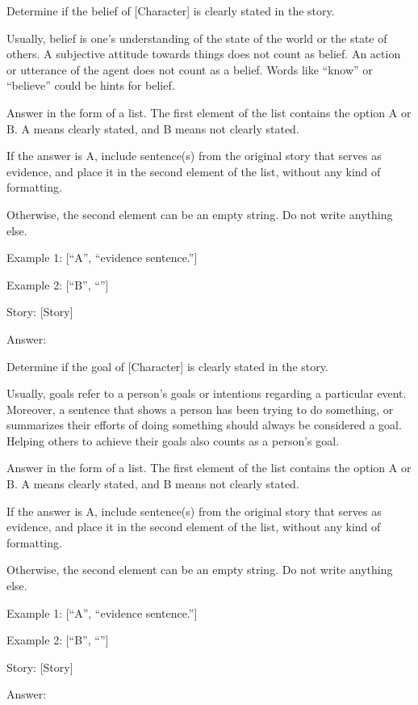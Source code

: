 \begin{tcolorbox}[
    breakable,
    colframe=green!40!black,
    colback=green!5,
    coltitle=white,
    fonttitle=\bfseries,
    title=Extracting beliefs,
    colbacktitle=green!40!black
]
Determine if the belief of [Character] is clearly stated in the story.

Usually, belief is one's understanding of the state of the world or the state of others. A subjective attitude towards things does not count as belief. An action or utterance of the agent does not count as a belief. Words like ``know'' or ``believe'' could be hints for belief.

Answer in the form of a list. The first element of the list contains the option A or B. A means clearly stated, and B means not clearly stated.

If the answer is A, include sentence(s) from the original story that serves as evidence, and place it in the second element of the list, without any kind of formatting.

Otherwise, the second element can be an empty string. Do not write anything else.

Example 1: [``A'', ``evidence sentence.'']

Example 2: [``B'', ``''] \newline

Story: [Story]

Answer:
\end{tcolorbox}



\begin{tcolorbox}[
    breakable,
    colframe=green!40!black,
    colback=green!5,
    coltitle=white,
    fonttitle=\bfseries,
    title=Extracting goals,
    colbacktitle=green!40!black
]
Determine if the goal of [Character] is clearly stated in the story.

Usually, goals refer to a person's goals or intentions regarding a particular event. Moreover, a sentence that shows a person has been trying to do something, or summarizes their efforts of doing something should always be considered a goal. Helping others to achieve their goals also counts as a person's goal.

Answer in the form of a list. The first element of the list contains the option A or B. A means clearly stated, and B means not clearly stated.

If the answer is A, include sentence(s) from the original story that serves as evidence, and place it in the second element of the list, without any kind of formatting.

Otherwise, the second element can be an empty string. Do not write anything else.

Example 1: [``A'', ``evidence sentence.'']

Example 2: [``B'', ``''] \newline

Story: [Story]

Answer:
\end{tcolorbox}


